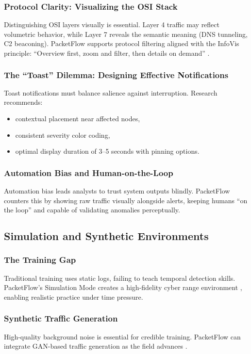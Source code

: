 \documentclass[
    11pt, 
    a4paper, 
    parskip=half, 
    headsepline,       %
    DIV=12             %
]{scrartcl}
\begin{document}
\subsubsection{Protocol Clarity: Visualizing the OSI Stack}
Distinguishing OSI layers visually is essential. Layer 4 traffic may reflect volumetric behavior, while Layer 7 reveals the semantic meaning (DNS tunneling, C2 beaconing). PacketFlow supports protocol filtering aligned with the InfoVis principle: ``Overview first, zoom and filter, then details on demand'' \cite{ref36}.

\subsubsection{The ``Toast'' Dilemma: Designing Effective Notifications}
Toast notifications must balance salience against interruption. Research recommends:
\begin{itemize}
    \item contextual placement near affected nodes,
    \item consistent severity color coding,
    \item optimal display duration of 3–5 seconds with pinning options.
\end{itemize}

\subsubsection{Automation Bias and Human-on-the-Loop}
Automation bias leads analysts to trust system outputs blindly. PacketFlow counters this by showing raw traffic visually alongside alerts, keeping humans ``on the loop'' and capable of validating anomalies perceptually.

\subsection{Simulation and Synthetic Environments}

\subsubsection{The Training Gap}
Traditional training uses static logs, failing to teach temporal detection skills. PacketFlow’s Simulation Mode creates a high-fidelity cyber range environment \cite{ref43}, enabling realistic practice under time pressure.

\subsubsection{Synthetic Traffic Generation}
High-quality background noise is essential for credible training. PacketFlow can integrate GAN-based traffic generation as the field advances \cite{ref50}.
\end{document}
